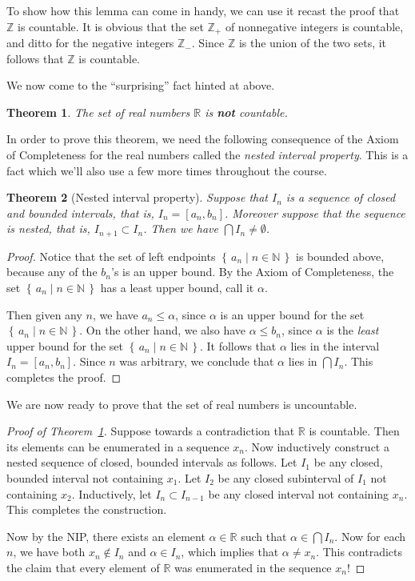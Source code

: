 \documentclass[11pt,oneside]{amsbook}
\newcommand{\set}[1]{\left\{\,#1\,\right\}}
\newcommand{\N}{\mathbb N}
\newcommand{\Z}{\mathbb Z}
\newcommand{\R}{\mathbb R}
\theoremstyle{definition}
\theoremstyle{plain}
\newtheorem{theorem}{Theorem}[section]
\theoremstyle{definition}
\theoremstyle{remark}
\numberwithin{equation}{section}
\numberwithin{figure}{section}
\begin{document}
To show how this lemma can come in handy, we can use it recast the proof that $\Z$ is countable. It is obvious that the set $\Z_+$ of nonnegative integers is countable, and ditto for the negative integers $\Z_-$. Since $\Z$ is the union of the two sets, it follows that $\Z$ is countable.

We now come to the ``surprising'' fact hinted at above.

\begin{theorem}
  \label{thm:reals-uncountable}
  The set of real numbers $\R$ is \textbf{not} countable.
\end{theorem}

In order to prove this theorem, we need the following consequence of the Axiom of Completeness for the real numbers called the \emph{nested interval property}. This is a fact which we'll also use a few more times throughout the course.

\begin{theorem}[Nested interval property]
  Suppose that $I_n$ is a sequence of closed and bounded intervals, that is, $I_n=[a_n,b_n]$. Moreover suppose that the sequence is nested, that is, $I_{n+1}\subset I_n$. Then we have $\bigcap I_n\neq\emptyset$.
\end{theorem}

\begin{proof}
  Notice that the set of left endpoints $\set{a_n\mid n\in\N}$ is bounded above, because any of the $b_n$'s is an upper bound. By the Axiom of Completeness, the set $\set{a_n\mid n\in\N}$ has a least upper bound, call it $\alpha$.

  Then given any $n$, we have $a_n\leq\alpha$, since $\alpha$ is an upper bound for the set $\set{a_n\mid n\in\N}$. On the other hand, we also have $\alpha\leq b_n$, since $\alpha$ is the \emph{least} upper bound for the set $\set{a_n\mid n\in\N}$. It follows that $\alpha$ lies in the interval $I_n=[a_n,b_n]$. Since $n$ was arbitrary, we conclude that $\alpha$ lies in $\bigcap I_n$. This completes the proof.
\end{proof}

We are now ready to prove that the set of real numbers is uncountable.

\begin{proof}[Proof of Theorem~\ref{thm:reals-uncountable}]
  Suppose towards a contradiction that $\R$ is countable. Then its elements can be enumerated in a sequence $x_n$. Now inductively construct a nested sequence of closed, bounded intervals as follows. Let $I_1$ be any closed, bounded interval not containing $x_1$. Let $I_2$ be any closed subinterval of $I_1$ not containing $x_2$. Inductively, let $I_n\subset I_{n-1}$ be any closed interval not containing $x_n$. This completes the construction.

  Now by the NIP, there exists an element $\alpha\in\R$ such that $\alpha\in\bigcap I_n$. Now for each $n$, we have both $x_n\notin I_n$ and $\alpha\in I_n$, which implies that $\alpha\neq x_n$. This contradicts the claim that every element of $\R$ was enumerated in the sequence $x_n$!
\end{proof}
\end{document}

